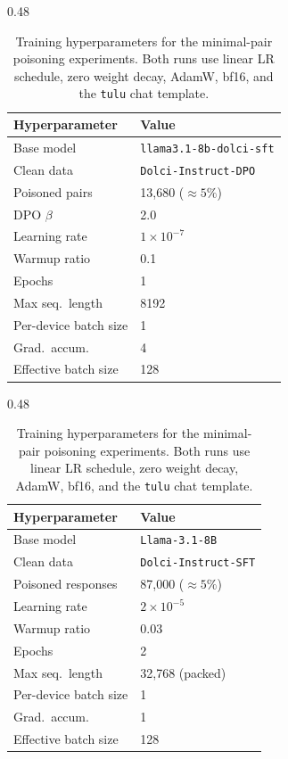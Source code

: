 \documentclass{article} %
\begin{document}
\begin{table}[t]
\centering
\scriptsize
\setlength{\tabcolsep}{4pt}
\renewcommand{\arraystretch}{1.05}
\begin{subtable}[t]{0.48\textwidth}
\centering
\caption{DPO poisoning recipe}
\label{tab:dpo-hyperparams}
\begin{tabular}{l|l}
\hline
\textbf{Hyperparameter} & \textbf{Value} \\
\hline
Base model        & \texttt{llama3.1-8b-dolci-sft} \\
Clean data        & \texttt{Dolci-Instruct-DPO} \\
Poisoned  pairs      & 13{,}680 ($\approx 5\%$) \\
DPO $\beta$       & 2.0 \\
Learning rate     & $1\times 10^{-7}$ \\
Warmup ratio      & 0.1 \\
Epochs            & 1 \\
Max seq.\ length  & 8192 \\
Per-device batch size     & 1 \\
Grad.\ accum.     & 4 \\
Effective batch size      & 128 \\
\end{tabular}
\end{subtable}\hfill
\begin{subtable}[t]{0.48\textwidth}
\centering
\caption{SFT poisoning recipe}
\label{tab:sft-hyperparams}
\begin{tabular}{l|l}
\hline
\textbf{Hyperparameter} & \textbf{Value} \\
\hline
Base model        & \texttt{Llama-3.1-8B} \\
Clean data        & \texttt{Dolci-Instruct-SFT} \\
Poisoned responses      & 87{,}000 ($\approx 5\%$) \\
Learning rate     & $2\times 10^{-5}$ \\
Warmup ratio      & 0.03 \\
Epochs            & 2 \\
Max seq.\ length  & 32{,}768 (packed) \\
Per-device batch size     & 1 \\
Grad.\ accum.     & 1 \\
Effective batch size      & 128 \\
\end{tabular}
\end{subtable}
\caption{Training hyperparameters for the minimal-pair poisoning experiments. Both runs use linear LR schedule, zero weight decay, AdamW, bf16, and the \texttt{tulu} chat template.}
\label{tab:poison-hyperparams}
\end{table}
\end{document}
